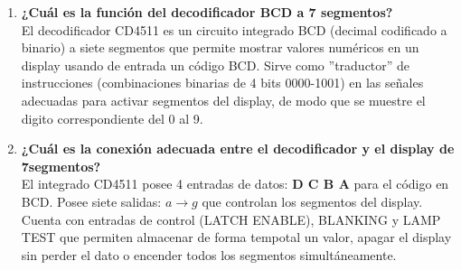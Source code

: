 \begin{enumerate}
    \item \textbf{¿Cuál es la función del decodificador BCD a 7 segmentos?}\\ 
        \sangria{} El decodificador CD4511 es un circuito integrado BCD (decimal codificado a binario) a siete segmentos que permite mostrar valores numéricos en un display usando de entrada un código BCD. Sirve como ''traductor'' de instrucciones (combinaciones binarias de 4 bits 0000-1001) en las señales adecuadas para activar segmentos del display, de modo que se muestre el digito correspondiente del 0 al 9. 
    \item \textbf{¿Cuál es la conexión adecuada entre el decodificador y el display de 7segmentos?}\\ 
        \sangria El integrado CD4511 posee 4 entradas de datos: \textbf{D C B A} para el código en BCD. Posee siete salidas: $a \rightarrow g$ que controlan los segmentos del display. Cuenta con entradas de control (LATCH ENABLE), BLANKING y LAMP TEST que permiten almacenar de forma tempotal un valor, apagar el display sin perder el dato o encender todos los segmentos simultáneamente. 


\end{enumerate}
